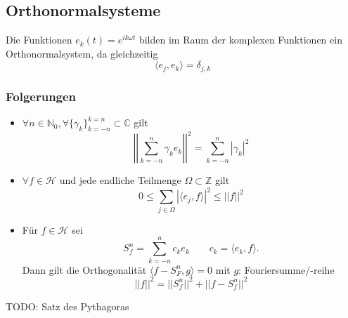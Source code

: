 \subsection{Orthonormalsysteme}
\begin{sectionbox}
    Die Funktionen $e_k(t)=e^{ik\omega t}$ bilden im Raum der komplexen Funktionen ein Orthonormalsystem, da gleichzeitig
    \begin{equation*}
        \langle e_j,e_k\rangle = \delta_{j,k}
    \end{equation*}

    \subsubsection{Folgerungen}
    \begin{itemize}
        \item $\forall n \in \mathbb N_0, \forall \{\gamma_k\}_{k=-n}^{k=n} \subset\mathbb C$ gilt
              \begin{equation*}
                  \left|\left| \sum_{k=-n}^{n}\gamma_ke_k \right|\right|^2 = \sum_{k=-n}^{n}|\gamma_k|^2
              \end{equation*}
        \item $\forall f \in \mathcal{H}$ und jede endliche Teilmenge $\Omega \subset\mathbb Z$ gilt
              \begin{equation*}
                  0 \le \sum_{j\in\Omega}|\langle e_j, f\rangle|^2 \le ||f||^2
              \end{equation*}
        \item Für $f\in\mathcal{H}$ sei
              \begin{equation*}
                  S_f^n=\sum_{k=-n}^{n}c_ke_k \qquad c_k=\langle e_k, f\rangle.
              \end{equation*} Dann gilt die Orthogonalität $\langle f-S_F^n, g\rangle = 0$ mit $g$: Fouriersumme/-reihe
              \begin{equation*}
                  ||f||^2 = ||S_f^n||^2 + ||f-S_f^n||^2
              \end{equation*}
    \end{itemize}

    TODO: Satz des Pythagoras


\end{sectionbox}
